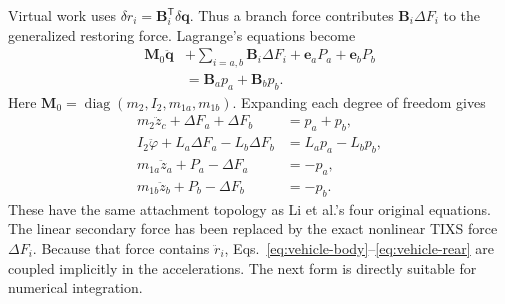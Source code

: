 \documentclass[a4paper,12pt]{article}
\numberwithin{equation}{section}
\newcommand{\vect}[1]{\boldsymbol{#1}}
\begin{document}
Virtual work uses $\delta r_i=\vect B_i^{\mathsf T}\delta\vect q$. Thus a branch force contributes $\vect B_i\Delta F_i$ to the generalized restoring force. Lagrange's equations become
\begin{equation}
\boxed{\begin{aligned}
\vect M_0\ddot{\vect q}
&+\sum_{i=a,b}\vect B_i\Delta F_i
 +\vect e_aP_a+\vect e_bP_b\\
&=\vect B_ap_a+\vect B_bp_b.
\end{aligned}}
\label{eq:vehicle-vector-implicit}
\end{equation}
Here $\vect M_0=\operatorname{diag}(m_2,I_2,m_{1a},m_{1b})$.
Expanding each degree of freedom gives
\begin{align}
m_2\ddot z_c+\Delta F_a+\Delta F_b
 &=p_a+p_b,\label{eq:vehicle-body}\\
I_2\ddot\varphi+L_a\Delta F_a-L_b\Delta F_b
 &=L_ap_a-L_bp_b,\label{eq:vehicle-pitch}\\
m_{1a}\ddot z_a+P_a-\Delta F_a
 &=-p_a,\label{eq:vehicle-front}\\
m_{1b}\ddot z_b+P_b-\Delta F_b
 &=-p_b.\label{eq:vehicle-rear}
\end{align}
These have the same attachment topology as Li et al.'s four original equations. The linear secondary force has been replaced by the exact nonlinear TIXS force $\Delta F_i$. Because that force contains $\ddot r_i$, Eqs.~\eqref{eq:vehicle-body}--\eqref{eq:vehicle-rear} are coupled implicitly in the accelerations. The next form is directly suitable for numerical integration.
\end{document}
